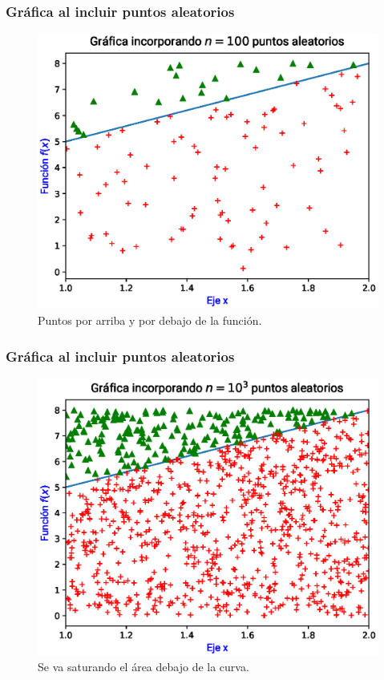 \begin{frame}
\frametitle{Gráfica al incluir puntos aleatorios}
\begin{figure}
    \centering
    \includegraphics[scale=0.55]{Imagenes/area_puntos_02.eps}
    \caption{Puntos por arriba y por debajo de la función.}
\end{figure}
\end{frame}
\begin{frame}
\frametitle{Gráfica al incluir puntos aleatorios}
\begin{figure}
    \centering
    \includegraphics[scale=0.55]{Imagenes/area_puntos_03.eps}
    \caption{Se va saturando el área debajo de la curva.}
\end{figure}
\end{frame}
